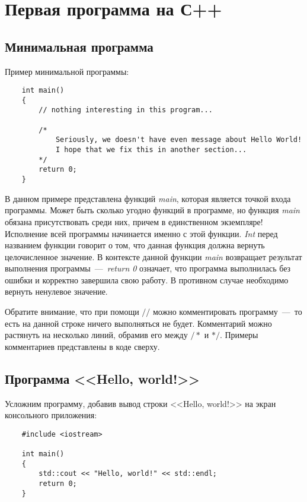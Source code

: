 \section{Первая программа на С++}
\subsection{Минимальная программа}

Пример минимальной программы:

\lstset{style=CPlusPlus}
\begin{lstlisting}
    int main()
    {
        // nothing interesting in this program...
        
        /*
            Seriously, we doesn't have even message about Hello World!
            I hope that we fix this in another section...
        */
        return 0;
    }
\end{lstlisting}

В данном примере представлена функций \textit{main}, которая является точкой входа программы. Может быть сколько угодно функций в программе, но функция \textit{main} обязана присутствовать среди них, причем в единственном экземпляре! Исполнение всей программы начинается именно с этой функции. \textit{Int} перед названием функции говорит о том, что данная функция должна вернуть целочисленное значение. В контексте данной функции \textit{main} возвращает результат выполнения программы~---~\textit{return 0} означает, что программа выполнилась без ошибки и корректно завершила свою работу. В противном случае необходимо вернуть ненулевое значение.

Обратите внимание, что при помощи $//$ можно комментировать программу~---~то есть на данной строке ничего выполняться не будет. Комментарий можно растянуть на несколько линий, обрамив его между $/*$ и $*/$. Примеры комментариев представлены в коде сверху.

\subsection{Программа <<Hello, world!>>}

Усложним программу, добавив вывод строки <<Hello, world!>> на экран консольного приложения:

\begin{lstlisting}
    #include <iostream>

    int main()
    {
        std::cout << "Hello, world!" << std::endl;
        return 0;
    }
\end{lstlisting}

